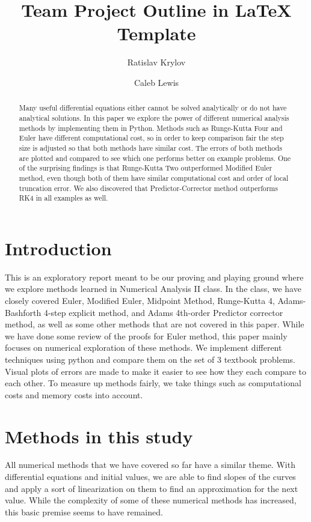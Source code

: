\documentclass[11pt]{article}	%
\title{Team Project Outline in LaTeX Template}
\author{Ratislav Krylov \and Caleb Lewis}
\date{} %
\begin{document}
\maketitle

\begin{abstract}
Many useful differential equations either cannot be solved analytically or do not have analytical solutions. 
In this paper we explore the power of different numerical analysis methods by implementing
them in Python.
Methods such as Runge-Kutta Four and Euler have different computational cost, so in order
to keep comparison fair the step size is adjusted so that both methods have similar cost.
The errors of both methods are plotted and compared to see which one performs better on
example problems. One of the surprising findings is that Runge-Kutta Two outperformed 
Modified Euler method, even though both of them have similar computational cost and order of 
local truncation error. We also discovered that Predictor-Corrector method outperforms RK4 in
all examples as well. 
\end{abstract}

\section{Introduction}
This is an exploratory report meant to be our proving and playing ground where we explore
methods learned in Numerical Analysis II class. In the class, we have closely covered Euler,
Modified Euler, Midpoint Method, Runge-Kutta 4, Adams-Bashforth 4-step explicit method,
and Adams 4th-order Predictor corrector method, as well as some other methods that are not
covered in this paper. While we have done some review of the proofs for Euler method, this 
paper mainly focuses on numerical exploration of these methods. We implement different techniques using python and compare them on the set of 3 textbook problems. Visual plots of errors are made 
to make it easier to see how they each compare to each other. To measure up methods fairly, we take
things such as computational costs and memory costs into account.

\section{Methods in this study}
All numerical methods that we have covered so far have a similar theme. With differential equations and initial values, we are able to find slopes of the curves and apply a sort of linearization on them to find an approximation for the next value. While the complexity of some of these numerical methods has increased, this basic premise seems to have remained. 
\end{document}
